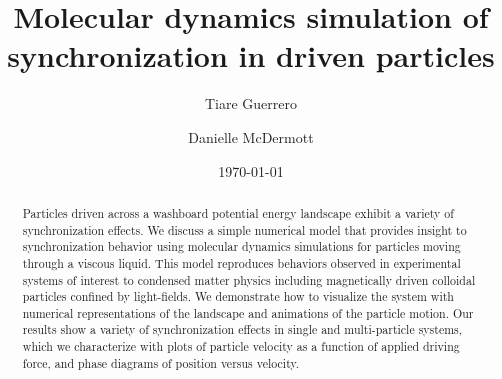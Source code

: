 \documentclass[twocolumn,preprintnumbers,amsmath,amssymb,aps,prx]{revtex4}
\begin{document}

\title{Molecular dynamics simulation of synchronization in driven particles}

\author{Tiare Guerrero}

\author{Danielle McDermott}

\date{\today}

\begin{abstract}
  Particles
  driven
  across a washboard potential energy landscape
  exhibit a variety of synchronization effects.
  We discuss a simple
  numerical model that
  provides insight
  to synchronization behavior
  using
  molecular dynamics simulations
  for particles moving through
  a viscous liquid.
  This model reproduces behaviors observed
  in experimental systems 
  of interest to condensed matter physics 
  including 
  magnetically driven colloidal particles
  confined by light-fields.
  We demonstrate how to 
  visualize
  the system with
  numerical representations of the landscape
  and
  animations of the particle motion.
  Our results show a variety of synchronization effects 
  in single and multi-particle systems, 
  which we characterize with
  plots of 
  particle velocity as a function of applied driving force,
  and phase diagrams of position versus velocity.
\end{abstract}
\end{document}

